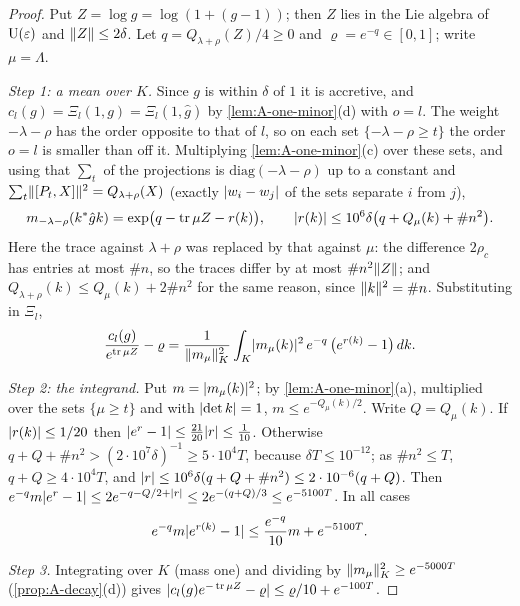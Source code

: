 \begin{proof}
Put $Z=\log g=\log(1+(g-1))$; then $Z$ lies in the Lie algebra of $\operatorname{U}(\varepsilon)$ and $\lVert Z\rVert\le2\delta$. Let $q=Q_{\lambda+\rho}(Z)/4\ge0$ and $\varrho=e^{-q}\in[0,1]$; write $\mu=\Lambda$.

\emph{Step 1: a mean over $K$.} Since $g$ is within $\delta$ of $1$ it is accretive, and $c_l(g)=\Xi_l(1,g)=\Xi_l(1,\hat g)$ by \cref{lem:A-one-minor}(d) with $o=l$. The weight $-\lambda-\rho$ has the order opposite to that of $l$, so on each set $\{-\lambda-\rho\ge t\}$ the
order $o=l$ is smaller than off it. Multiplying \cref{lem:A-one-minor}(c) over these sets, and using that $\sum_t$ of the projections is $\mathrm{diag}(-\lambda-\rho)$ up to a constant and $\sum_t\lVert [P_t,X]\rVert^2=Q_{\lambda+\rho}(X)$ (exactly $\lvert w_i-w_j\rvert$ of the sets separate $i$ from $j$),
\[
  m_{-\lambda-\rho}(k^*\hat gk)=\exp\bigl(q-\operatorname{tr}\mu Z-r(k)\bigr),\qquad\lvert r(k)\rvert\le10^6\delta\bigl(q+Q_\mu(k)+\#n^2\bigr).
\]
Here the trace against $\lambda+\rho$ was replaced by that against $\mu$: the difference $2\rho_c$ has entries at most $\#n$, so the traces differ by at most $\#n^2\lVert Z\rVert$; and $Q_{\lambda+\rho}(k)\le Q_\mu(k)+2\#n^2$ for the same reason, since $\lVert k\rVert^2=\#n$.
Substituting in $\Xi_l$,
\[
  \frac{c_l(g)}{e^{\operatorname{tr}\mu Z}}-\varrho=\frac1{\lVert m_\mu\rVert^2_K}\int_K\lvert m_\mu(k)\rvert^2\,e^{-q}\,\bigl(e^{r(k)}-1\bigr)\,dk.
\]

\emph{Step 2: the integrand.} Put $m=\lvert m_\mu(k)\rvert^2$; by \cref{lem:A-one-minor}(a), multiplied over the sets $\{\mu\ge t\}$ and with $\lvert \det k\rvert=1$, $m\le e^{-Q_\mu(k)/2}$. Write $Q=Q_\mu(k)$. If $\lvert r(k)\rvert\le1/20$ then $\lvert e^r-1\rvert\le\frac{21}{20}\lvert r\rvert\le\frac1{10}$. Otherwise $q+Q+\#n^2>(2\cdot10^7\delta)^{-1}\ge5\cdot10^4T$, because $\delta T\le10^{-12}$; as $\#n^2\le T$, $q+Q\ge4\cdot10^4T$, and
$\lvert r\rvert\le10^6\delta(q+Q+\#n^2)\le2\cdot10^{-6}(q+Q)$. Then $e^{-q}m\lvert e^r-1\rvert\le2e^{-q-Q/2+\lvert r\rvert}\le2e^{-(q+Q)/3}\le e^{-5100T}$. In all cases
\[
  e^{-q}m\lvert e^{r(k)}-1\rvert\le\frac{e^{-q}}{10}m+e^{-5100T}.
\]

\emph{Step 3.} Integrating over $K$ (mass one) and dividing by $\lVert m_\mu\rVert^2_K\ge e^{-5000T}$ (\cref{prop:A-decay}(d)) gives $\lvert c_l(g)e^{-\operatorname{tr}\mu Z}-\varrho\rvert\le\varrho/10+e^{-100T}$.
\end{proof}

